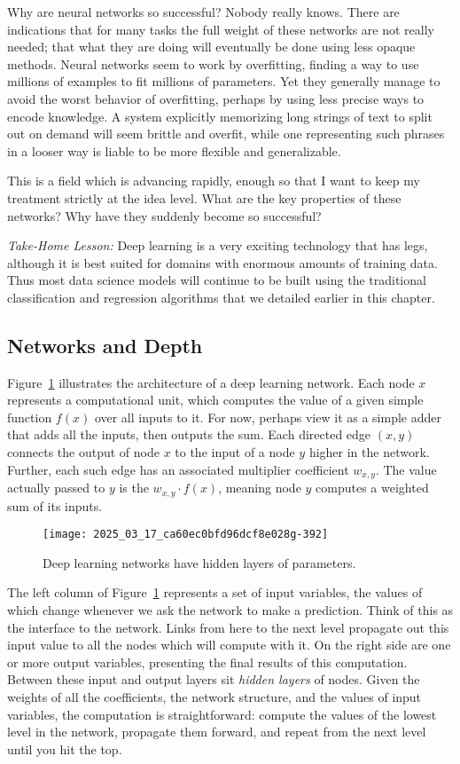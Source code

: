 \documentclass[10pt]{article}
\begin{document}
\begin{enumerate}
Why are neural networks so successful? Nobody really knows. There are indications that for many tasks the full weight of these networks are not really needed; that what they are doing will eventually be done using less opaque methods. Neural networks seem to work by overfitting, finding a way to use millions of examples to fit millions of parameters. Yet they generally manage to avoid the worst behavior of overfitting, perhaps by using less precise ways to encode knowledge. A system explicitly memorizing long strings of text to split out on demand will seem brittle and overfit, while one representing such phrases in a looser way is liable to be more flexible and generalizable.

This is a field which is advancing rapidly, enough so that I want to keep my treatment strictly at the idea level. What are the key properties of these networks? Why have they suddenly become so successful?

\textit{Take-Home Lesson:} Deep learning is a very exciting technology that has legs, although it is best suited for domains with enormous amounts of training data. Thus most data science models will continue to be built using the traditional classification and regression algorithms that we detailed earlier in this chapter.

\subsection{Networks and Depth}
Figure~\ref{fig:deeplearningarch} illustrates the architecture of a deep learning network. Each node $x$ represents a computational unit, which computes the value of a given simple function $f(x)$ over all inputs to it. For now, perhaps view it as a simple adder that adds all the inputs, then outputs the sum. Each directed edge $(x, y)$ connects the output of node $x$ to the input of a node $y$ higher in the network. Further, each such edge has an associated multiplier coefficient $w_{x,y}$. The value actually passed to $y$ is the $w_{x,y} \cdot f(x)$, meaning node $y$ computes a weighted sum of its inputs.

\begin{figure}[h]
\centering
\texttt{[image: 2025\_03\_17\_ca60ec0bfd96dcf8e028g-392]}
\caption{Deep learning networks have hidden layers of parameters.}
\label{fig:deeplearningarch}
\end{figure}

The left column of Figure~\ref{fig:deeplearningarch} represents a set of input variables, the values of which change whenever we ask the network to make a prediction. Think of this as the interface to the network. Links from here to the next level propagate out this input value to all the nodes which will compute with it. On the right side are one or more output variables, presenting the final results of this computation. Between these input and output layers sit \textit{hidden layers} of nodes. Given the weights of all the coefficients, the network structure, and the values of input variables, the computation is straightforward: compute the values of the lowest level in the network, propagate them forward, and repeat from the next level until you hit the top.


\end{enumerate}
\end{document}
